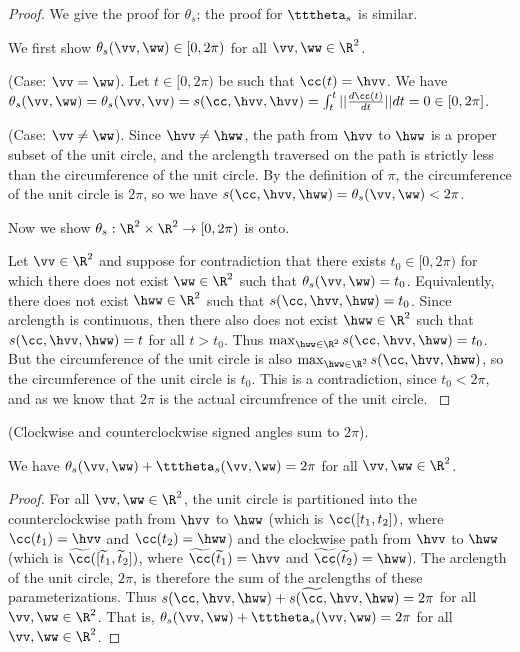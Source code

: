 \begin{proof}
    We give the proof for $\theta_s$; the proof for $\tttheta_s$ is similar.

    We first show $\theta_s(\vv, \ww) \in [0, 2\pi)$ for all $\vv, \ww \in \R^2$.

    \fullindent
    {
        (Case: $\vv = \ww$). Let $t \in [0, 2\pi)$ be such that $\cc(t) = \hvv$. We have $\theta_s(\vv, \ww) = \theta_s(\vv, \vv) = s(\cc, \hvv, \hvv) = \int_t^t ||\frac{d\cc(t)}{dt}|| dt = 0 \in [0, 2\pi]$.
    }

    \fullindent
    {
        (Case: $\vv \neq \ww$). Since $\hvv \neq \hww$, the path from $\hvv$ to $\hww$ is a proper subset of the unit circle, and the arclength traversed on the path is strictly less than the circumference of the unit circle. By the definition of $\pi$, the circumference of the unit circle is $2\pi$, so we have $s(\cc, \hvv, \hww) = \theta_s(\vv, \ww) < 2\pi$.
    }

    Now we show $\theta_s:\R^2 \times \R^2 \rightarrow [0, 2\pi)$ is onto.

    \fullindent
    {
        Let $\vv \in \R^2$ and suppose for contradiction that there exists $t_0 \in [0, 2\pi)$ for which there does not exist $\ww \in \R^2$ such that $\theta_s(\vv, \ww) = t_0$. Equivalently, there does not exist $\hww \in \R^2$ such that $s(\cc, \hvv, \hww) = t_0$. Since arclength is continuous, then there also does not exist $\hww \in \R^2$ such that $s(\cc, \hvv, \hww) = t$ for all $t > t_0$. Thus $\max_{\hww \in \R^2} s(\cc, \hvv, \hww) = t_0$. But the circumference of the unit circle is also $\max_{\hww \in \R^2} s(\cc, \hvv, \hww)$, so the circumference of the unit circle is $t_0$. This is a contradiction, since $t_0 < 2\pi$, and as we know that $2\pi$ is the actual circumfrence of the unit circle.
    }
\end{proof}

\begin{theorem}
    (Clockwise and counterclockwise signed angles sum to $2\pi$).

    We have $\theta_s(\vv, \ww) + \tttheta_s(\vv, \ww) = 2\pi$ for all $\vv, \ww \in \R^2$.
\end{theorem}

\begin{proof}
    For all $\vv, \ww \in \R^2$, the unit circle is partitioned into the counterclockwise path from $\hvv$ to $\hww$ (which is $\cc([t_1, t_2])$, where $\cc(t_1) = \hvv$ and $\cc(t_2) = \hww$) and the clockwise path from $\hvv$ to $\hww$ (which is $\widetilde{\cc}([\widetilde{t}_1, \widetilde{t}_2])$, where $\widetilde{\cc}(\widetilde{t}_1) = \hvv$ and $\widetilde{\cc}(\widetilde{t}_2) = \hww$). The arclength of the unit circle, $2\pi$, is therefore the sum of the arclengths of these parameterizations. Thus $s(\cc, \hvv, \hww) + s(\widetilde{\cc}, \hvv, \hww) = 2\pi$ for all $\vv, \ww \in \R^2$. That is, $\theta_s(\vv, \ww) + \tttheta_s(\vv, \ww) = 2\pi$ for all $\vv, \ww \in \R^2$.
\end{proof}

